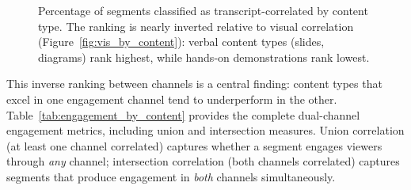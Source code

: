 \documentclass[fleqn,10pt]{wlscirep}
\begin{document}
\begin{figure}[ht]
    \centering
    \caption{Percentage of segments classified as transcript-correlated by content type. The ranking is nearly inverted relative to visual correlation (Figure~\ref{fig:vis_by_content}): verbal content types (slides, diagrams) rank highest, while hands-on demonstrations rank lowest.}
    \label{fig:tr_by_content}
\end{figure}

This inverse ranking between channels is a central finding: content types that excel in one engagement channel tend to underperform in the other. Table~\ref{tab:engagement_by_content} provides the complete dual-channel engagement metrics, including union and intersection measures. Union correlation (at least one channel correlated) captures whether a segment engages viewers through \emph{any} channel; intersection correlation (both channels correlated) captures segments that produce engagement in \emph{both} channels simultaneously.
\end{document}
